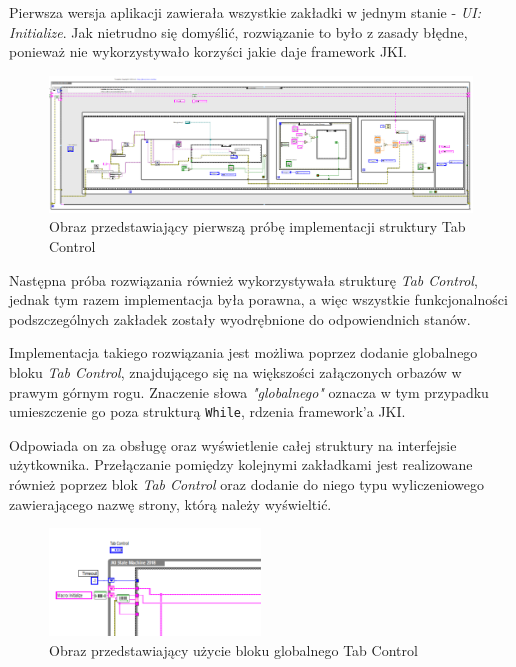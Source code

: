 \documentclass{report}
\begin{document}
Pierwsza wersja aplikacji zawierała wszystkie zakładki w jednym stanie - \textit{UI: Initialize}. Jak nietrudno się domyślić, rozwiązanie to było z zasady błędne, ponieważ nie wykorzystywało korzyści jakie daje framework JKI. 

\begin{figure}[H]
    \centering
    \includegraphics[width=1.0\textwidth]{src/first-att.png}
    \caption{Obraz przedstawiający pierwszą próbę implementacji struktury Tab Control}
    \label{fig:first-att}
\end{figure}

Następna próba rozwiązania również wykorzystywała strukturę \textit{Tab Control}, jednak tym razem implementacja była porawna, a więc wszystkie funkcjonalności podszczególnych zakładek zostały wyodrębnione do odpowiendnich stanów. 

Implementacja takiego rozwiązania jest możliwa poprzez dodanie globalnego bloku \textit{Tab Control}, znajdującego się na większości załączonych orbazów w prawym górnym rogu. Znaczenie słowa \textit{"globalnego"} oznacza w tym przypadku umieszczenie go poza strukturą \texttt{While}, rdzenia framework'a JKI.

Odpowiada on za obsługę oraz wyświetlenie całej struktury na interfejsie użytkownika. Przełączanie pomiędzy kolejnymi zakładkami jest realizowane również poprzez blok \textit{Tab Control} oraz dodanie do niego typu wyliczeniowego zawierającego nazwę strony, którą należy wyświeltić. 

\begin{figure}[H]
    \centering
    \includegraphics[width=0.5\textwidth]{src/tab-control.png}
    \caption{Obraz przedstawiający użycie bloku globalnego Tab Control}
    \label{fig:tab-control}
\end{figure}
\end{document}
